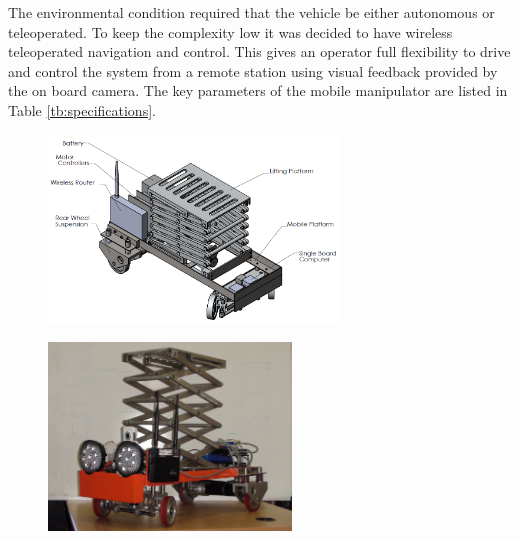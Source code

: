  The environmental condition required that the vehicle be either  autonomous or teleoperated. To keep the complexity low it was decided to have wireless teleoperated   navigation and control. This gives an  operator full flexibility to drive  and control the system from a remote station  using  visual  feedback provided by the on board camera. The key parameters of the mobile manipulator are listed in  Table \ref{tb:specifications}.


 \begin{figure}
 	\centering
 	\begin{minipage}{.5\textwidth}
 		\centering
 		\includegraphics[height=5cm,keepaspectratio]{Chapter3/fig/robo3Dmodel}
 		\label{fig:robo3Dmodel}
 	\end{minipage}%
 	\begin{minipage}{.5\textwidth}
 		\centering
 		\includegraphics[width=.8\linewidth,height=5cm,keepaspectratio]{Chapter3/fig/roboActual}
 		\label{fig:roboActual}
 	\end{minipage}
 \end{figure}

